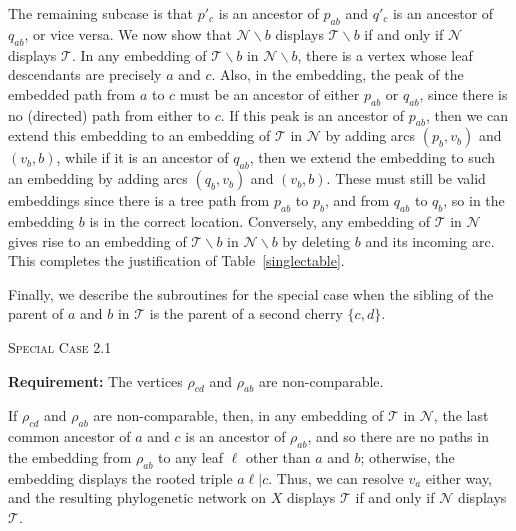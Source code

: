 \documentclass[11pt]{amsart}
\begin{document}
The remaining subcase is that $p'_c$ is an ancestor of $p_{ab}$ and $q'_c$ is an ancestor of $q_{ab}$, or vice versa. We now show that ${{\mathcal N}}\backslash b$ displays ${{\mathcal T}}\backslash b$ if and only if ${{\mathcal N}}$ displays ${{\mathcal T}}$.
In any embedding of ${{\mathcal T}}\backslash b$ in ${{\mathcal N}}\backslash b$, there is a vertex whose leaf descendants are precisely $a$ and $c$. Also, in the embedding, the peak of the embedded path from $a$ to $c$ must be an ancestor of either $p_{ab}$ or $q_{ab}$, since there is no (directed) path from either to $c$. If this peak is an ancestor of $p_{ab}$, then we can extend this embedding to an embedding of ${{\mathcal T}}$ in ${{\mathcal N}}$ by adding arcs $(p_b, v_b)$ and $(v_b, b)$, while if it is an ancestor of $q_{ab}$, then we extend the embedding to such an embedding by adding arcs $(q_b, v_b)$ and $(v_b, b)$. These must still be valid embeddings since there is a tree path from $p_{ab}$ to $p_b$, and from $q_{ab}$ to $q_b$, so in the embedding $b$ is in the correct location. Conversely, any embedding of ${{\mathcal T}}$ in ${{\mathcal N}}$ gives rise to an embedding of ${{\mathcal T}}\backslash b$ in ${{\mathcal N}}\backslash b$ by deleting $b$ and its incoming arc. This completes the justification of Table~\ref{singlectable}.

Finally, we describe the subroutines for the special case when the sibling of the parent of $a$ and $b$ in ${{\mathcal T}}$ is the parent of a second cherry $\{c, d\}$.

\begin{algorithm}[H]
 \caption{\textsc{Special Case 2.1}}
\begin{algorithmic}[1]
 \Statex\textbf{Requirement:} The vertices $\rho_{cd}$ and $\rho_{ab}$ are non-comparable.
 \end{algorithmic}
\end{algorithm}

If $\rho_{cd}$ and $\rho_{ab}$ are non-comparable, then, in any embedding of ${{\mathcal T}}$ in ${{\mathcal N}}$, the last common ancestor of $a$ and $c$ is an ancestor of $\rho_{ab}$, and so there are no paths in the embedding from $\rho_{ab}$ to any leaf $\ell$ other than $a$ and $b$; otherwise, the embedding displays the rooted triple $a\ell|c$. Thus, we can resolve $v_a$ either way, and the resulting phylogenetic network on $X$ displays ${{\mathcal T}}$ if and only if ${{\mathcal N}}$ displays ${{\mathcal T}}$.
\end{document}
